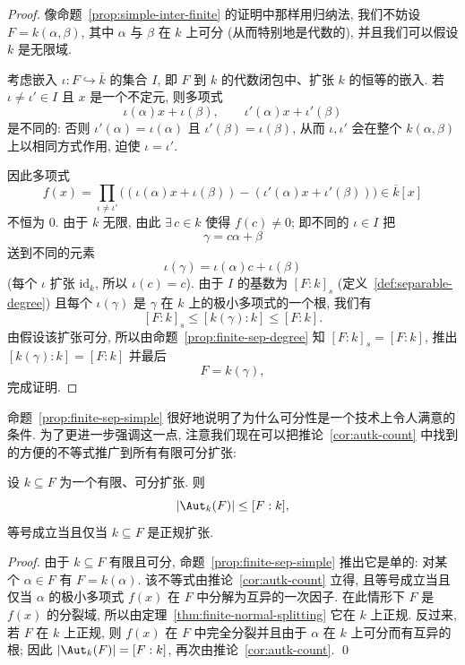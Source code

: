 \begin{proof}
像命题~\ref{prop:simple-inter-finite} 的证明中那样用归纳法, 我们不妨设 $F=k(\alpha,\beta)$, 其中 $\alpha$ 与 $\beta$ 在 $k$ 上可分 (从而特别地是代数的), 并且我们可以假设 $k$ 是无限域.

考虑嵌入 $\iota:F\hookrightarrow\overline{k}$ 的集合 $I$, 即 $F$ 到 $k$ 的代数闭包中、扩张 $k$ 的恒等的嵌入. 若 $\iota\neq\iota'\in I$ 且 $x$ 是一个不定元, 则多项式
\[
\iota(\alpha)x+\iota(\beta),\qquad\iota'(\alpha)x+\iota'(\beta)
\]
是不同的: 否则 $\iota'(\alpha)=\iota(\alpha)$ 且 $\iota'(\beta)=\iota(\beta)$, 从而 $\iota,\iota'$ 会在整个 $k(\alpha,\beta)$ 上以相同方式作用, 迫使 $\iota=\iota'$.

因此多项式
\[
f(x)=\prod_{\iota\neq\iota'}\bigl((\iota(\alpha)x+\iota(\beta))-(\iota'(\alpha)x+\iota'(\beta))\bigr)\in\overline{k}[x]
\]
不恒为 $0$. 由于 $k$ 无限, 由此 $\exists\,c\in k$ 使得 $f(c)\neq 0$; 即不同的 $\iota\in I$ 把
\[
\gamma=c\alpha+\beta
\]
送到不同的元素
\[
\iota(\gamma)=\iota(\alpha)c+\iota(\beta)
\]
(每个 $\iota$ 扩张 $\mathrm{id}_k$, 所以 $\iota(c)=c$). 由于 $I$ 的基数为 $[F:k]_s$ (定义~\ref{def:separable-degree}) 且每个 $\iota(\gamma)$ 是 $\gamma$ 在 $k$ 上的极小多项式的一个根, 我们有
\[
[F:k]_s\leq[k(\gamma):k]\leq[F:k].
\]
由假设该扩张可分, 所以由命题~\ref{prop:finite-sep-degree} 知 $[F:k]_s=[F:k]$, 推出 $[k(\gamma):k]=[F:k]$ 并最后
\[
F=k(\gamma),
\]
完成证明.
\end{proof}

命题~\ref{prop:finite-sep-simple} 很好地说明了为什么可分性是一个技术上令人满意的条件. 为了更进一步强调这一点, 注意我们现在可以把推论~\ref{cor:autk-count} 中找到的方便的不等式推广到所有有限可分扩张:

\begin{corollary}\label{cor:aut-ineq}
设 $k\subseteq F$ 为一个有限、可分扩张. 则
\[
|\Aut_k(F)|\leq[F:k],
\]
等号成立当且仅当 $k\subseteq F$ 是正规扩张.
\end{corollary}

\begin{proof}
由于 $k\subseteq F$ 有限且可分, 命题~\ref{prop:finite-sep-simple} 推出它是单的: 对某个 $\alpha\in F$ 有 $F=k(\alpha)$. 该不等式由推论~\ref{cor:autk-count} 立得, 且等号成立当且仅当 $\alpha$ 的极小多项式 $f(x)$ 在 $F$ 中分解为互异的一次因子. 在此情形下 $F$ 是 $f(x)$ 的分裂域, 所以由定理~\ref{thm:finite-normal-splitting} 它在 $k$ 上正规. 反过来, 若 $F$ 在 $k$ 上正规, 则 $f(x)$ 在 $F$ 中完全分裂并且由于 $\alpha$ 在 $k$ 上可分而有互异的根; 因此 $|\Aut_k(F)|=[F:k]$, 再次由推论~\ref{cor:autk-count}. \qed
\end{proof}


